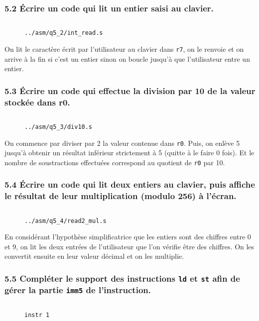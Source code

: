 \documentclass[twoside, 12pt, a4paper]{article}
\newcommand{\fm}[2]{
\begin{figure}[!h]
    \centering
    \inputminted[]{asm}{#1}
    \caption{\texttt{#2}}
\end{figure}
}
\newcommand{\fmo}[4]{
\begin{figure}[!h]
    \centering
    \inputminted[firstline=#3, lastline=#4]{ocaml}{#1}
    \caption{\texttt{#2}}
\end{figure}
}
\begin{document}
        \subsubsection*{\textbf{5.2} Écrire un code qui lit un entier saisi au clavier.}

\fm{../asm/q5_2/int_read.s}{../asm/q5\_2/int\_read.s}

On lit le caractère écrit par l'utilisateur au clavier dans \texttt{r7}, on le renvoie et on arrive à la fin si c'est un entier sinon on boucle jusqu'à que l'utilisateur entre un entier.

\clearpage
         
        \subsubsection*{\textbf{5.3} Écrire un code qui effectue la division par 10 de la valeur stockée dans r0.}

\fm{../asm/q5_3/div10.s}{../asm/q5\_3/div10.s}

On commence par diviser par 2 la valeur contenue dans \texttt{r0}. Puis, on enlève 5 jusqu'à obtenir un résultat inférieur strictement à 5 (quitte à le faire 0 fois). Et le nombre de soustractions effectuées correspond au quotient de \texttt{r0} par 10.

        \subsubsection*{\textbf{5.4} Écrire un code qui lit deux entiers au clavier, puis affiche le résultat de leur multiplication (modulo 256) à l'écran.}

\fm{../asm/q5_4/read2_mul.s}{../asm/q5\_4/read2\_mul.s}

En considérant l'hypothèse simplificatrice que les entiers sont des chiffres entre 0 et 9, on lit les deux entrées de l'utilisateur que l'on vérifie être des chiffres.
On les convertit ensuite en leur valeur décimal et on les multiplie.

\clearpage
        
        \subsubsection*{\textbf{5.5} Compléter le support des instructions \texttt{ld} et \texttt{st} afin de gérer la partie \texttt{imm5} de l'instruction.}

\fmo{../patch/digcomp_jb.patch.dbu}{instr 1}{14}{15}
\end{document}
